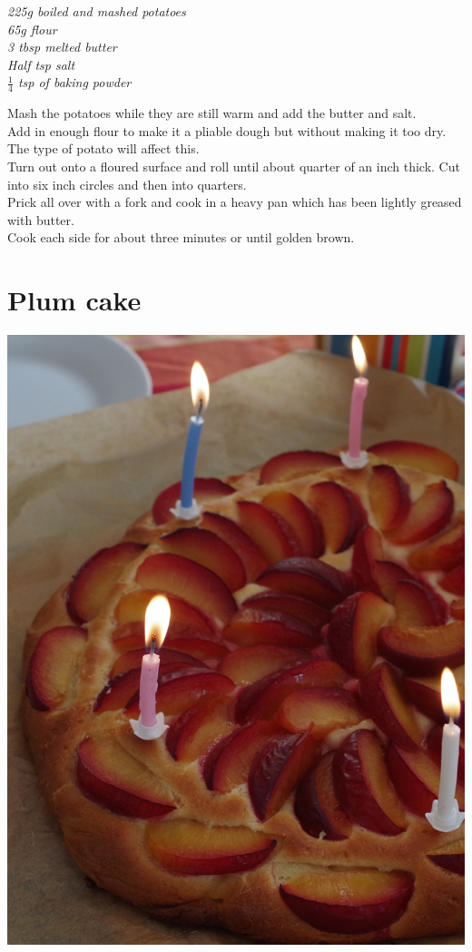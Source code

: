 \documentclass{tufte-book}
\begin{document}
\smallskip
\emph{225g boiled and mashed potatoes
\\65g flour 
\\3 tbsp melted butter
\\Half tsp salt
\\$\frac{1}{4}$ tsp of baking powder
}

\smallskip
Mash the potatoes while they are still warm and add the butter and salt. 
\\Add in enough flour to make it a pliable dough but without making it too dry. The type of potato will affect this. 
\\Turn out onto a floured surface and roll until about quarter of an inch thick. Cut into six inch circles and then into quarters. 
\\Prick all over with a fork and cook in a heavy pan which has been lightly greased with butter. 
\\Cook each side for about three minutes or until golden brown.

\newpage

\section{Plum cake}

\begin{marginfigure}%
  \includegraphics[width=\linewidth]{plumcake.png}
\end{marginfigure}
\end{document}
